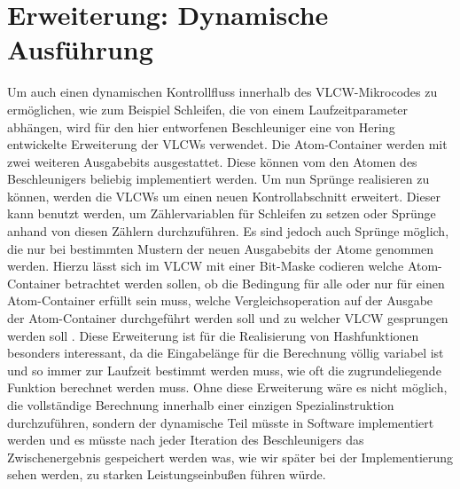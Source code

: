\section{Erweiterung: Dynamische Ausführung}
Um auch einen dynamischen Kontrollfluss innerhalb des VLCW-Mikrocodes zu ermöglichen, wie zum Beispiel Schleifen, die von einem Laufzeitparameter abhängen,
wird für den hier entworfenen Beschleuniger eine von Hering \cite{hering2020} entwickelte Erweiterung der VLCWs verwendet. Die Atom-Container werden mit zwei weiteren Ausgabebits ausgestattet.
Diese können vom den Atomen des Beschleunigers beliebig implementiert werden. Um nun Sprünge realisieren zu können, werden die VLCWs um einen neuen Kontrollabschnitt erweitert.
Dieser kann benutzt werden, um Zählervariablen für Schleifen zu setzen oder Sprünge anhand von diesen Zählern durchzuführen. Es sind jedoch auch Sprünge möglich,
die nur bei bestimmten Mustern der neuen Ausgabebits der Atome genommen werden. Hierzu lässt sich im VLCW mit einer Bit-Maske codieren welche Atom-Container betrachtet werden sollen,
ob die Bedingung für alle oder nur für einen Atom-Container erfüllt sein muss, welche Vergleichsoperation auf der Ausgabe der Atom-Container durchgeführt werden soll und
zu welcher VLCW gesprungen werden soll \cite{hering2020}. Diese Erweiterung ist für die Realisierung von Hashfunktionen besonders interessant,
da die Eingabelänge für die Berechnung völlig variabel ist und so immer zur Laufzeit bestimmt werden muss, wie oft die zugrundeliegende Funktion berechnet werden muss.
Ohne diese Erweiterung wäre es nicht möglich, die vollständige Berechnung innerhalb einer einzigen Spezialinstruktion durchzuführen, sondern der dynamische Teil müsste
in Software implementiert werden und es müsste nach jeder Iteration des Beschleunigers das Zwischenergebnis gespeichert werden was, wie wir später bei der Implementierung
sehen werden, zu starken Leistungseinbußen führen würde.